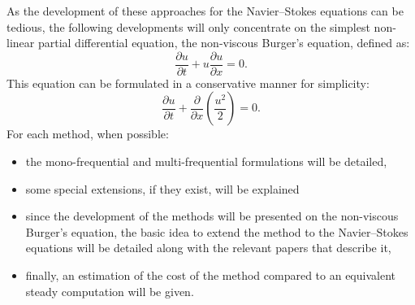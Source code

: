 As the development of these approaches for the Navier--Stokes equations
can be tedious, the following developments 
will only concentrate on the simplest
non-linear partial differential equation, 
the non-viscous Burger's equation, defined as:
\begin{equation}
  \frac{\partial u}{\partial t} + 
  u \frac{\partial u}{\partial x} = 
  0.
  \label{eq:sm_nonlinear_convection}
\end{equation}
This equation can be formulated in a conservative manner for simplicity:
\begin{equation}
  \frac{\partial u}{\partial t} + 
  \frac{\partial}{\partial x} \left( \frac{u^2}{2} \right) = 
  0.
  \label{eq:sm_nonlinear_convection_conservative}
\end{equation}
For each method, when possible:
\begin{itemize} \itemsep0pt \parskip0pt
  \item the mono-frequential and multi-frequential 
  formulations will be detailed,
  \item some special extensions, if they exist, will be explained
  \item since the development of the methods will be 
  presented on the non-viscous 
  Burger's equation, 
  the basic idea to extend the method to the Navier--Stokes
  equations will be detailed along with the relevant papers
  that describe it,
  \item finally, an estimation of the cost of the method 
  compared to an equivalent steady computation will be given.
\end{itemize}
